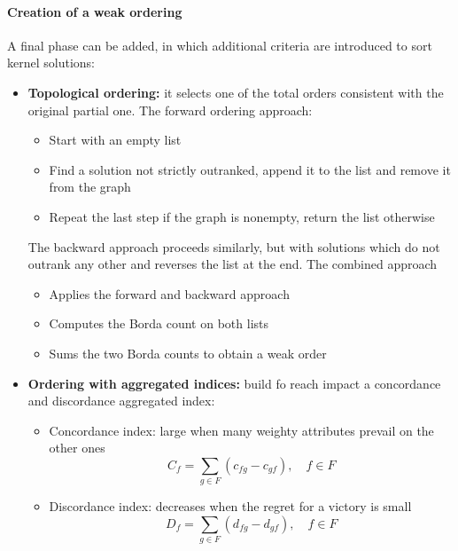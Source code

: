 \paragraph{Creation of a weak ordering} A final phase can be added, in which additional criteria are introduced to sort kernel solutions: 
\begin{itemize}
	\item \textbf{Topological ordering:} it selects one of the total orders consistent with the original partial one. The forward ordering approach:
	\begin{itemize}
		\item Start with an empty list
		
		\item Find a solution not strictly outranked, append it to the list and remove it from the graph
		
		\item Repeat the last step if the graph is nonempty, return the list otherwise
	\end{itemize}
	The backward approach proceeds similarly, but with solutions which do not outrank any other and reverses the list at the end. The combined approach
	\begin{itemize}
		\item Applies the forward and backward approach
		
		\item Computes the Borda count on both lists 
		
		\item Sums the two Borda counts to obtain a weak order
	\end{itemize}
	
	\item \textbf{Ordering with aggregated indices:} build fo reach impact a concordance and discordance aggregated index: 
	\begin{itemize}
		\item Concordance index: large when many weighty attributes prevail on the other ones
		$$ C_f = \sum_{g \in F} (c_{fg} - c_{gf}), \quad f \in F $$
		
		\item Discordance index: decreases when the regret for a victory is small
		$$ D_f = \sum_{g \in F} (d_{fg} - d_{gf}), \quad f \in F $$
	\end{itemize}
\end{itemize}